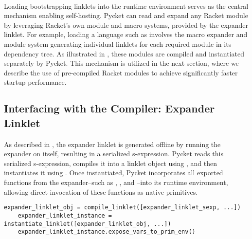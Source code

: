 
		\paragraph{}%
			Loading bootstrapping linklets into the runtime environment serves as the central mechanism enabling self-hosting. Pycket can read and expand any Racket module by leveraging Racket's own module and macro systems, provided by the expander linklet. For example, loading a language such as  involves the macro expander and module system generating individual linklets for each required module in its dependency tree. As illustrated in , these modules are compiled and instantiated separately by Pycket. This mechanism is utilized in the next section, where we describe the use of pre-compiled Racket modules to achieve significantly faster startup performance.

		\subsection{Interfacing with the Compiler: Expander Linklet}

			\paragraph{}%
				As described in , the expander linklet is generated offline by running the expander on itself, resulting in a serialized s-expression. Pycket reads this serialized s-expression, compiles it into a linklet object using , and then instantiates it using . Once instantiated, Pycket incorporates all exported functions from the expander--such as , , and --into its runtime environment, allowing direct invocation of these functions as native primitives.

			\begin{center}
				\begin{minipage}{0.95\textwidth}
					\begin{lstlisting}[style=inline-python,frame=lines,numbers=none]
	expander_linklet_obj = compile_linklet([expander_linklet_sexp, ...])
	expander_linklet_instance = instantiate_linklet([expander_linklet_obj, ...])
	expander_linklet_instance.expose_vars_to_prim_env()\end{lstlisting}
				\end{minipage}
			\end{center}

